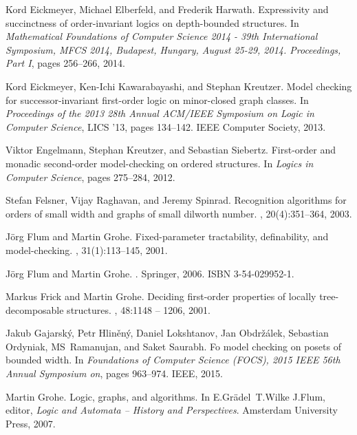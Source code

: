 \documentclass[12pt]{amsart}
\begin{document}
\begin{thebibliography}{10}
Kord Eickmeyer, Michael Elberfeld, and Frederik Harwath.
\newblock Expressivity and succinctness of order-invariant logics on
  depth-bounded structures.
\newblock In {\em Mathematical Foundations of Computer Science 2014 - 39th
  International Symposium, {MFCS} 2014, Budapest, Hungary, August 25-29, 2014.
  Proceedings, Part {I}}, pages 256--266, 2014.

Kord Eickmeyer, Ken-Ichi Kawarabayashi, and Stephan Kreutzer.
\newblock Model checking for successor-invariant first-order logic on
  minor-closed graph classes.
\newblock In {\em Proceedings of the 2013 28th Annual ACM/IEEE Symposium on
  Logic in Computer Science}, LICS '13, pages 134--142. IEEE Computer Society,
  2013.

Viktor Engelmann, Stephan Kreutzer, and Sebastian Siebertz.
\newblock First-order and monadic second-order model-checking on ordered
  structures.
\newblock In {\em Logics in Computer Science}, pages 275--284, 2012.

Stefan Felsner, Vijay Raghavan, and Jeremy Spinrad.
\newblock Recognition algorithms for orders of small width and graphs of small
  dilworth number.
, 20(4):351--364, 2003.

J{\"o}rg Flum and Martin Grohe.
\newblock Fixed-parameter tractability, definability, and model-checking.
, 31(1):113--145, 2001.

Jörg Flum and Martin Grohe.
.
\newblock Springer, 2006.
\newblock ISBN 3-54-029952-1.

Markus Frick and Martin Grohe.
\newblock Deciding first-order properties of locally tree-decomposable
  structures.
, 48:1148 -- 1206, 2001.

Jakub Gajarský, Petr Hliněný, Daniel Lokshtanov, Jan Obdržálek, Sebastian
  Ordyniak, MS~Ramanujan, and Saket Saurabh.
\newblock Fo model checking on posets of bounded width.
\newblock In {\em Foundations of Computer Science (FOCS), 2015 IEEE 56th Annual
  Symposium on}, pages 963--974. IEEE, 2015.

Martin Grohe.
\newblock Logic, graphs, and algorithms.
\newblock In E.Gr{\"a}del~T.Wilke J.Flum, editor, {\em Logic and Automata --
  History and Perspectives}. Amsterdam University Press, 2007.


\end{thebibliography}
\end{document}
